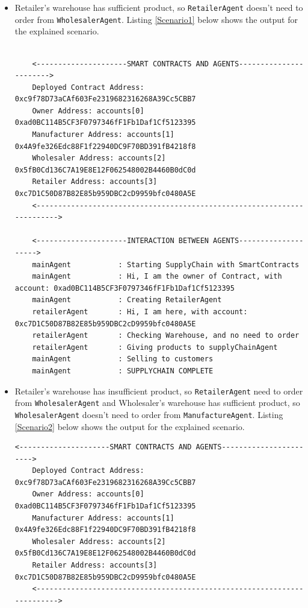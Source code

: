 \begin{itemize}
    \item Retailer's warehouse has sufficient product, so \texttt{RetailerAgent} doesn't need to order from \texttt{WholesalerAgent}. Listing \ref{Scenario1} below shows the output for the explained scenario.

    \vspace{.5cm}
    \begin{lstlisting}[caption={Agent Interaction (Scenario 1)},label={Scenario1}, numbers=none, basicstyle=\ttfamily\tiny]
    
    <---------------------SMART CONTRACTS AND AGENTS----------------------->
    Deployed Contract Address: 0xc9f78D73aCAf603Fe2319682316268A39Cc5CBB7
    Owner Address: accounts[0] 0xad0BC114B5CF3F0797346fF1Fb1Daf1Cf5123395
    Manufacturer Address: accounts[1] 0x4A9fe326Edc88F1f22940DC9F70BD391fB4218f8
    Wholesaler Address: accounts[2] 0x5fB0Cd136C7A19E8E12F062548002B4460B0dC0d
    Retailer Address: accounts[3] 0xc7D1C50D87B82E85b959DBC2cD9959bfc0480A5E
    <------------------------------------------------------------------------>
    
    <---------------------INTERACTION BETWEEN AGENTS-------------------->
    mainAgent           : Starting SupplyChain with SmartContracts
    mainAgent           : Hi, I am the owner of Contract, with account: 0xad0BC114B5CF3F0797346fF1Fb1Daf1Cf5123395
    mainAgent           : Creating RetailerAgent
    retailerAgent       : Hi, I am here, with account: 0xc7D1C50D87B82E85b959DBC2cD9959bfc0480A5E
    retailerAgent       : Checking Warehouse, and no need to order
    retailerAgent       : Giving products to supplyChainAgent
    mainAgent           : Selling to customers
    mainAgent           : SUPPLYCHAIN COMPLETE
    \end{lstlisting}
    
    \vspace{.5cm}
    
    \item Retailer's warehouse has insufficient product, so \texttt{RetailerAgent} need to order from \texttt{WholesalerAgent} and Wholesaler's warehouse has sufficient product, so \texttt{WholesalerAgent} doesn't need to order from \texttt{ManufactureAgent}. Listing \ref{Scenario2} below shows the output for the explained scenario.

    \vspace{.5cm}
    \begin{lstlisting}[caption={Agent Interaction (Scenario 2)},label={Scenario2},numbers=none, basicstyle=\ttfamily\tiny]
    <---------------------SMART CONTRACTS AND AGENTS----------------------->
    Deployed Contract Address: 0xc9f78D73aCAf603Fe2319682316268A39Cc5CBB7
    Owner Address: accounts[0] 0xad0BC114B5CF3F0797346fF1Fb1Daf1Cf5123395
    Manufacturer Address: accounts[1] 0x4A9fe326Edc88F1f22940DC9F70BD391fB4218f8
    Wholesaler Address: accounts[2] 0x5fB0Cd136C7A19E8E12F062548002B4460B0dC0d
    Retailer Address: accounts[3] 0xc7D1C50D87B82E85b959DBC2cD9959bfc0480A5E
    <------------------------------------------------------------------------>
    

\end{lstlisting}
\end{itemize}
